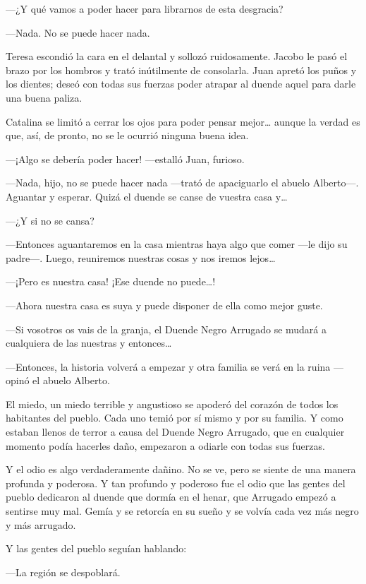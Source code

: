 \documentclass{barcodevapor3pags}
\begin{document}
---¿Y qué vamos a poder hacer para librarnos de esta desgracia?

---Nada. No se puede hacer nada.

Teresa escondió la cara en el delantal y sollozó ruidosamente. Jacobo le
pasó el brazo por los hombros y trató inútilmente de consolarla. Juan
apretó los puños y los dientes; deseó con todas sus fuerzas poder
atrapar al duende aquel para darle una buena paliza.

Catalina se limitó a cerrar los ojos para poder pensar mejor\ldots{}
aunque la verdad es que, así, de pronto, no se le ocurrió ninguna buena
idea.

---¡Algo se debería poder hacer! ---estalló Juan, furioso.

---Nada, hijo, no se puede hacer nada ---trató de apaciguarlo el abuelo
Alberto---. Aguantar y esperar. Quizá el duende se canse de vuestra casa
y\ldots{}

---¿Y si no se cansa?

---Entonces aguantaremos en la casa mientras haya algo que comer ---le
dijo su padre---. Luego, reuniremos nuestras cosas y nos iremos
lejos\ldots{}

---¡Pero es nuestra casa! ¡Ese duende no puede\ldots!

---Ahora nuestra casa es suya y puede disponer de ella como mejor guste.

---Si vosotros os vais de la granja, el Duende Negro Arrugado se mudará
a cualquiera de las nuestras y entonces\ldots{}

---Entonces, la historia volverá a empezar y otra familia se verá en la
ruina ---opinó el abuelo Alberto.

El miedo, un miedo terrible y angustioso se apoderó del corazón de todos
los habitantes del pueblo. Cada uno temió por sí mismo y por su familia.
Y como estaban llenos de terror a causa del Duende Negro Arrugado, que
en cualquier momento podía hacerles daño, empezaron a odiarle con todas
sus fuerzas.

Y el odio es algo verdaderamente dañino. No se ve, pero se siente de una
manera profunda y poderosa. Y tan profundo y poderoso fue el odio que
las gentes del pueblo dedicaron al duende que dormía en el henar, que
Arrugado empezó a sentirse muy mal. Gemía y se retorcía en su sueño y se
volvía cada vez más negro y más arrugado.

Y las gentes del pueblo seguían hablando:

---La región se despoblará.
\end{document}
